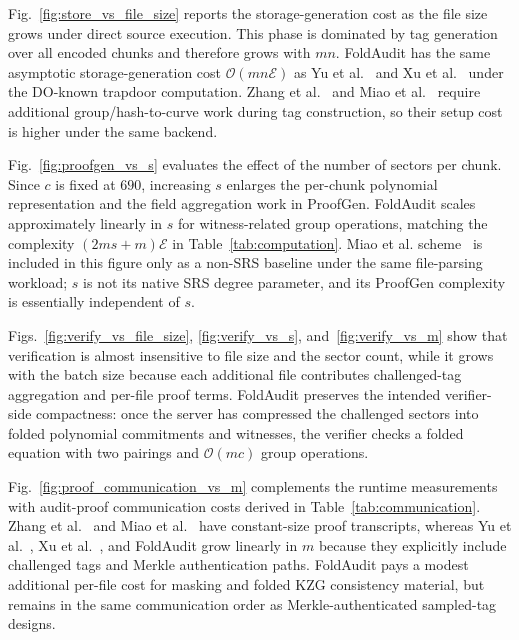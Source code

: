 \documentclass[lettersize,journal]{IEEEtran}
\newcommand{\CompExp}{\mathcal{E}}
\begin{document}
Fig.~\ref{fig:store_vs_file_size} reports the storage-generation cost as the file size grows under direct source execution. This phase is dominated by tag generation over all encoded chunks and therefore grows with $mn$. FoldAudit has the same asymptotic storage-generation cost $\mathcal{O}(mn\CompExp)$ as Yu et al.~\cite{YuTC25} and Xu et al.~\cite{XuTIFS26} under the DO-known trapdoor computation. Zhang et al.~\cite{ZhangTPDS23} and Miao et al.~\cite{MiaoSCIS2026} require additional group/hash-to-curve work during tag construction, so their setup cost is higher under the same backend. 

Fig.~\ref{fig:proofgen_vs_s} evaluates the effect of the number of sectors per chunk. Since $c$ is fixed at $690$, increasing $s$ enlarges the per-chunk polynomial representation and the field aggregation work in \textsf{ProofGen}. FoldAudit scales approximately linearly in $s$ for witness-related group operations, matching the complexity $(2ms+m)\CompExp$ in Table~\ref{tab:computation}. Miao et al. scheme~\cite{MiaoSCIS2026} is included in this figure only as a non-SRS baseline under the same file-parsing workload; $s$ is not its native SRS degree parameter, and its \textsf{ProofGen} complexity is essentially independent of $s$. 

Figs.~\ref{fig:verify_vs_file_size}, \ref{fig:verify_vs_s}, and~\ref{fig:verify_vs_m} show that verification is almost insensitive to file size and the sector count, while it grows with the batch size because each additional file contributes challenged-tag aggregation and per-file proof terms. FoldAudit preserves the intended verifier-side compactness: once the server has compressed the challenged sectors into folded polynomial commitments and witnesses, the verifier checks a folded equation with two pairings and $\mathcal{O}(mc)$ group operations.

Fig.~\ref{fig:proof_communication_vs_m} complements the runtime measurements with audit-proof communication costs derived in Table~\ref{tab:communication}. Zhang et al.~\cite{ZhangTPDS23} and Miao et al.~\cite{MiaoSCIS2026} have constant-size proof transcripts, whereas Yu et al.~\cite{YuTC25}, Xu et al.~\cite{XuTIFS26}, and FoldAudit grow linearly in \(m\) because they explicitly include challenged tags and Merkle authentication paths. 
FoldAudit pays a modest additional per-file cost for masking and folded KZG consistency material, but remains in the same communication order as Merkle-authenticated sampled-tag designs. 
\end{document}
